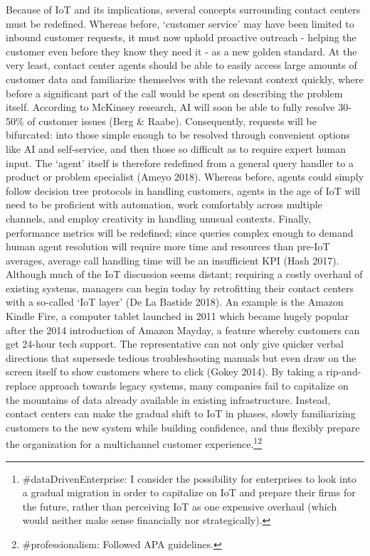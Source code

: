 \documentclass[11pt]{article}
\begin{document}
Because of IoT and its implications, several concepts surrounding contact centers must be redefined. Whereas before, `customer service' may have been limited to inbound customer requests, it must now uphold proactive outreach - helping the customer even before they know they need it - as a new golden standard. At the very least, contact center agents should be able to easily access large amounts of customer data and familiarize themselves with the relevant context quickly, where before a significant part of the call would be spent on describing the problem itself. According to McKinsey research, AI will soon be able to fully resolve 30-50\% of customer issues (Berg \& Raabe). Consequently, requests will be bifurcated: into those simple enough to be resolved through convenient options like AI and self-service, and then those so difficult as to require expert human input. The `agent' itself is therefore redefined from a general query handler to a product or problem specialist (Ameyo 2018). Whereas before, agents could simply follow decision tree protocols in handling customers, agents in the age of IoT will need to be proficient with automation, work comfortably across multiple channels, and employ creativity in handling unusual contexts. Finally, performance metrics will be redefined; since queries complex enough to demand human agent resolution will require more time and resources than pre-IoT averages, average call handling time will be an insufficient KPI (Hash 2017).\\

Although much of the IoT discussion seems distant; requiring a costly overhaul of existing systems, managers can begin today by retrofitting their contact centers with a so-called `IoT layer' (De La Bastide 2018). An example is the Amazon Kindle Fire, a computer tablet launched in 2011 which became hugely popular after the 2014 introduction of Amazon Mayday, a feature whereby customers can get 24-hour tech support. The representative can not only give quicker verbal directions that supersede tedious troubleshooting manuals but even draw on the screen itself to show customers where to click (Gokey 2014). By taking a rip-and-replace approach towards legacy systems, many companies fail to capitalize on the mountains of data already available in existing infrastructure. Instead, contact centers can make the gradual shift to IoT in phases, slowly familiarizing customers to the new system while building confidence, and thus flexibly prepare the organization for a multichannel customer experience.\footnote{\#dataDrivenEnterprise: I consider the possibility for enterprises to look into a gradual migration in order to capitalize on IoT and prepare their firms for the future, rather than perceiving IoT as one expensive overhaul (which would neither make sense financially nor strategically).}\footnote{\#professionalism: Followed APA guidelines.}
\end{document}
